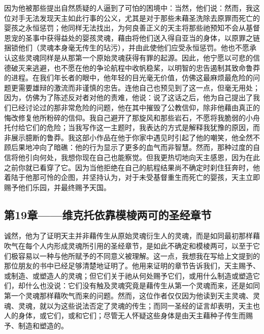 因为他被那些提出自然质疑的人逼到了可怕的困境中：当然，他们说：然而，我这位对手无法发现天主如此行事的公义，尤其是对于那些未藉圣洗除去原罪而死亡的婴孩之永恒惩罚；他同样无法找出，为何良善正义的天主将那些祂预知不会从基督恩宠的圣事中获得益处的婴孩灵魂，藉由将他们送入得自亚当的身体，以原罪之链捆锁他们（灵魂本身毫无传生的玷污），并由此使他们应受永恒惩罚。他也不愿承认这些灵魂同样是从那第一个原始灵魂获得有罪的起源。因此，他宁愿以可悲的信德破灭来逃避，也不愿在他的争论航程中收帆稳桨，以明智的忠告遏制其致命鲁莽的进程。在我们年长者的眼中，他年轻的目光毫无价值，仿佛这最麻烦最危险的问题更需要雄辩的激流而非谨慎的忠告。连他自己也预见到了这一点，但毫无用处；因为，仿佛为了陈述反对者对他的责难，他说：说了这话之后，他为自己提出了我们已经讨论过的那非常危险的问题，他在其中摧毁了公教信仰，除非他藉由真正的悔改修复他所粉碎的信仰。我自己避开了那旋风和那些岩石，不愿将我脆弱的小舟托付给它们的危险；当我写作这一主题时，我表达的方式是解释我犹豫的原因，而非展示臆断的鲁莽。我这部小作品在他于你家中遇见时引起了他的嘲笑，他全然不顾后果地冲向了暗礁：他的行为显示了更多的血气而非智慧。然而，那种过度的自信将他引向何处，我想你现在自己也能察觉。但我更热切地向天主感恩，因为在此之前你就已看穿了它。因为当他拒绝在自己的航程结果尚不确定时刹住狂奔时，他着陆于他那可怜的企图，并坚持认为，对于未受基督重生而死亡的婴孩，天主立即赐予他们乐园，并最终赐予天国。\par


\subsection{第19章——维克托依靠模棱两可的圣经章节}

诚然，他为了证明天主并非藉传生从原始灵魂衍生人的灵魂，而是如同最初那样藉吹气在每个人内形成灵魂所引用的圣经章节，是如此不确定和模棱两可，以至于它们极容易以一种与他所赋予的不同意义被理解。这一点，我想我在写给上文提到的那位朋友的书中已经足够清楚地证明了。他用来证明的章节告诉我们，天主赐予、或制造、或塑造人的灵魂；但它们关于祂从何处赐予它们，或用什么制造或塑造它们，却什么也没说：它们没有触及灵魂究竟是藉传生从第一个灵魂而来，还是如同第一个灵魂那样藉吹气而来的问题。然而，这位作者仅仅因为他读到天主灵魂、灵魂、灵魂，就以为这些说法否定了灵魂的传生；而同一圣经的证言却表明，天主也人的身体，或它们，或和它们；尽管无人怀疑这些身体是由天主藉种子传生而赐予、制造和塑造的。\par

